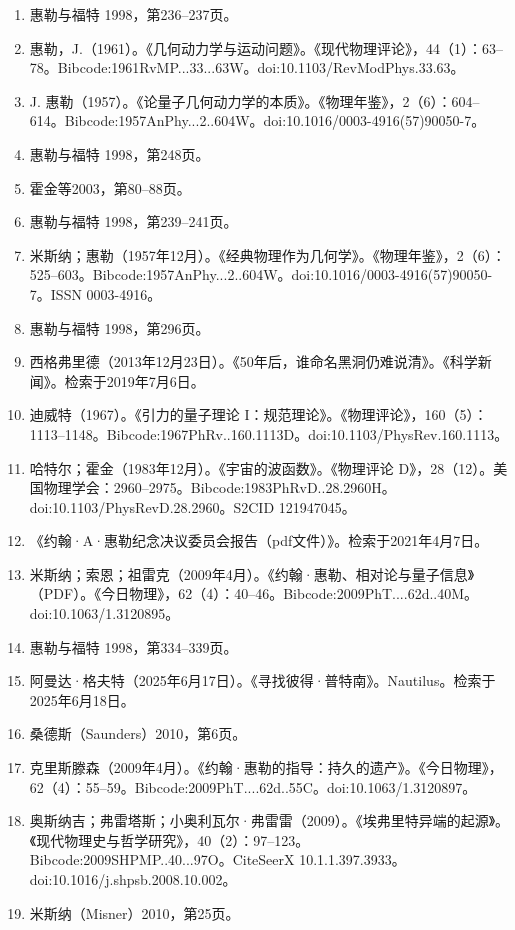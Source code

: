 \begin{enumerate}
\item 惠勒与福特 1998，第236–237页。
\item 惠勒，J.（1961）。《几何动力学与运动问题》。《现代物理评论》，44（1）：63–78。Bibcode:1961RvMP...33...63W。doi:10.1103/RevModPhys.33.63。
\item J. 惠勒（1957）。《论量子几何动力学的本质》。《物理年鉴》，2（6）：604–614。Bibcode:1957AnPhy...2..604W。doi:10.1016/0003-4916(57)90050-7。
\item 惠勒与福特 1998，第248页。
\item 霍金等2003，第80–88页。
\item 惠勒与福特 1998，第239–241页。
\item 米斯纳；惠勒（1957年12月）。《经典物理作为几何学》。《物理年鉴》，2（6）：525–603。Bibcode:1957AnPhy...2..604W。doi:10.1016/0003-4916(57)90050-7。ISSN 0003-4916。
\item 惠勒与福特 1998，第296页。
\item 西格弗里德（2013年12月23日）。《50年后，谁命名黑洞仍难说清》。《科学新闻》。检索于2019年7月6日。
\item 迪威特（1967）。《引力的量子理论 I：规范理论》。《物理评论》，160（5）：1113–1148。Bibcode:1967PhRv..160.1113D。doi:10.1103/PhysRev.160.1113。
\item 哈特尔；霍金（1983年12月）。《宇宙的波函数》。《物理评论 D》，28（12）。美国物理学会：2960–2975。Bibcode:1983PhRvD..28.2960H。doi:10.1103/PhysRevD.28.2960。S2CID 121947045。
\item 《约翰·A·惠勒纪念决议委员会报告（pdf文件）》。检索于2021年4月7日。
\item 米斯纳；索恩；祖雷克（2009年4月）。《约翰·惠勒、相对论与量子信息》（PDF）。《今日物理》，62（4）：40–46。Bibcode:2009PhT....62d..40M。doi:10.1063/1.3120895。
\item 惠勒与福特 1998，第334–339页。
\item 阿曼达·格夫特（2025年6月17日）。《寻找彼得·普特南》。Nautilus。检索于2025年6月18日。
\item 桑德斯（Saunders）2010，第6页。
\item 克里斯滕森（2009年4月）。《约翰·惠勒的指导：持久的遗产》。《今日物理》，62（4）：55–59。Bibcode:2009PhT....62d..55C。doi:10.1063/1.3120897。
\item 奥斯纳吉；弗雷塔斯；小奥利瓦尔·弗雷雷（2009）。《埃弗里特异端的起源》。《现代物理史与哲学研究》，40（2）：97–123。Bibcode:2009SHPMP..40...97O。CiteSeerX 10.1.1.397.3933。doi:10.1016/j.shpsb.2008.10.002。
\item 米斯纳（Misner）2010，第25页。

\end{enumerate}
